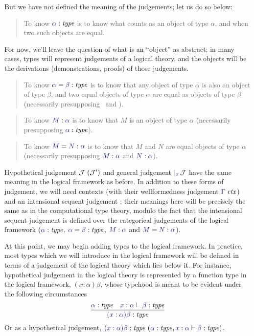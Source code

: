 \documentclass[main.tex]{subfiles}
\begin{document}
But we have not defined the meaning of the judgements; let us do so below:

\begin{quote}
  To know $\type\alpha$ is to know what counts as an object of type $\alpha$,
  and when two such objects are equal.
\end{quote}

For now, we'll leave the question of what is an ``object'' as
abstract; in many cases, types will represent judgements of a logical
theory, and the objects will be the derivations (demonstrations,
proofs) of those judgements.

\begin{quote}
  To know $\etype{\alpha}{\beta}$ is to know that any object of type $\alpha$ is
  also an object of type $\beta$, and two equal objects of type $\alpha$ are
  equal as objects of type $\beta$ (necessarily presupposing \type\alpha\ and
  \type\beta).
\end{quote}

\begin{quote}
  To know $\ofty{M}{\alpha}$ is to know that $M$ is an object of type $\alpha$
  (necessarily presupposing $\type\alpha$).
\end{quote}

\begin{quote}
  To know $\eofty{M}{N}{\alpha}$ is to know that $M$ and $N$ are equal objects of type
  $\alpha$ (necessarily presupposing $\ofty{M}{\alpha}$ and $\ofty{N}{\alpha}$).
\end{quote}

Hypothetical judgement $\mathcal{J}\ (\mathcal{J}')$ and general
judgement $\genj{x}{\mathcal{J}}$ have the same meaning in the logical
framework as before. In addition to these forms of judgement, we will
need contexts (with their wellformedness judgement $\isctx{\Gamma}$)
and an intensional sequent judgement
; their meanings here will
be precisely the same as in the computational type theory, modulo the
fact that the intensional sequent judgement is defined over the
categorical judgements of the logical framework ($\type\alpha$,
$\etype{\alpha}{\beta}$, $\ofty{M}{\alpha}$ and $\eofty{M}{N}{\alpha}$).

At this point, we may begin adding types to the logical framework. In
practice, most types which we will introduce in the logical framework
will be defined in terms of a judgement of the logical theory which
lies below it.  For instance, hypothetical judgement in the logical
theory is represented by a function type in the logical framework,
$(x:\alpha)\beta$, whose typehood is meant to be evident under the
following circumstances
\[
  \infer{
    \type{(x:\alpha)\beta}
  }{
    \type\alpha &
    \lfsequent{x:\alpha}{\type\beta}
  }
\]
Or as a hypothetical judgement,
$\hyp{\type{(x:\alpha)\beta}}{\type\alpha,\lfsequent{x:\alpha}{\type\beta}}$.
\end{document}
